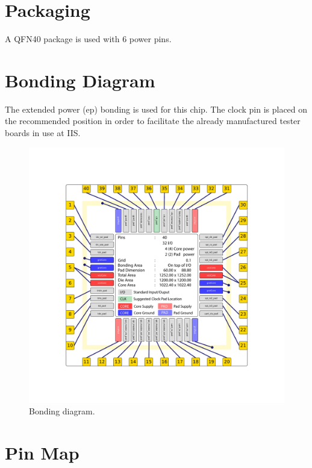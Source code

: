 \section{Packaging}

A QFN40 package is used with 6 power pins.

\section{Bonding Diagram}

The extended power (ep) bonding is used for this chip. The clock pin is placed on the recommended position in order to facilitate the already manufactured tester boards in use at IIS.

\begin{figure}[htbp]
  \centering \includegraphics[width=\textwidth]{./figures/pad_instaces_img_ord}
  \caption{Bonding diagram.}
\end{figure}

\section{Pin Map}

